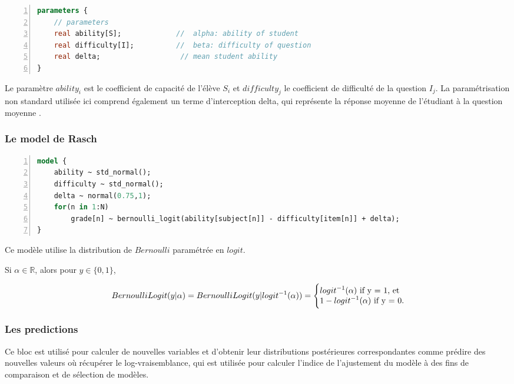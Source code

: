\begin{lstlisting}[language=Stan,basicstyle=\scriptsize, frame=l,framesep=4.5mm,framexleftmargin=2.5mm,tabsize=2,numbers=left,fillcolor=\color{blueforest!70},rulecolor=\color{blueforest},numberstyle=\normalfont\tiny\color{white}]
parameters {
	// parameters
	real ability[S];             //  alpha: ability of student
	real difficulty[I];          //  beta: difficulty of question
	real delta;                   // mean student ability
}
\end{lstlisting}
Le paramètre  \(\displaystyle ability_{i} \) est le coefficient de capacité de l'élève \(\displaystyle S_{i} \) et \(\displaystyle difficulty_{j} \) le coefficient de difficulté de la question \(\displaystyle I_{j} \). La paramétrisation non standard utilisée ici comprend également un terme d'interception delta, qui représente la réponse moyenne de l'étudiant à la question moyenne \cite{data_analysis_irt}.

\subsubsection{Le model de Rasch}

\begin{lstlisting}[language=Stan,basicstyle=\scriptsize, frame=l,framesep=4.5mm,framexleftmargin=2.5mm,tabsize=2,numbers=left,fillcolor=\color{blueforest!70},rulecolor=\color{blueforest},numberstyle=\normalfont\tiny\color{white}]
model {
	ability ~ std_normal();         
	difficulty ~ std_normal();   
	delta ~ normal(0.75,1);
	for(n in 1:N)
		grade[n] ~ bernoulli_logit(ability[subject[n]] - difficulty[item[n]] + delta);
}
\end{lstlisting}
Ce modèle utilise la distribution de \(\displaystyle Bernoulli \) paramétrée en  \(\displaystyle logit \).

Si \(\displaystyle \alpha \in \mathbb{R} \), alors pour \(\displaystyle y \in \{ 0,1 \} \), 

\begin{equation}
    BernoulliLogit(y|\alpha) = BernoulliLogit(y|logit^{-1} (\alpha)) = \Bigg \{ 
\begin{tabular}{@{}l@{}}
    \(\displaystyle logit^{-1} (\alpha)\)  if y = 1, et \\
    \(\displaystyle 1-logit^{-1}(\alpha) \)  if y = 0. 
\end{tabular}
\end{equation}


\subsubsection{Les predictions}
Ce bloc est utilisé pour calculer de nouvelles variables et d'obtenir leur distributions postérieures correspondantes comme prédire des nouvelles valeurs où récupérer le log-vraisemblance, qui est utilisée pour calculer l’indice de l'ajustement du modèle à des fins de comparaison et de sélection de modèles.

